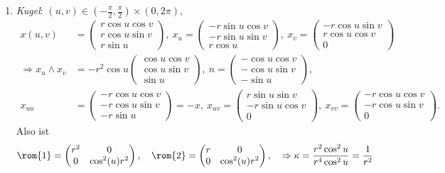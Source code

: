 \begin{example}
\begin{enumerate}
    \item \emph{Kugel}: $ (u,v) \in \left( -\tfrac{\pi}{2}, \tfrac{\pi}{2} \right) \times (0, 2\pi) $,
    \begin{align*}
      x(u,v) &= \left( \begin{smallmatrix}
      r\cos u \cos v \\ r\cos u \sin v \\ r\sin u
    \end{smallmatrix} \right), \ x_u = \left( \begin{smallmatrix}
      -r\sin u \cos v \\ -r\sin u \sin v \\ r\cos u
    \end{smallmatrix} \right), \ x_v = \left( \begin{smallmatrix}
      -r\cos u \sin v \\ r\cos u \cos v \\ 0
    \end{smallmatrix} \right) \\
    \Rightarrow x_u \wedge x_v &= -r^2\cos u \left( \begin{smallmatrix}
      \cos u \cos v \\ \cos u \sin v \\ \sin u
    \end{smallmatrix} \right), \ n = \left( \begin{smallmatrix}
      -\cos u \cos v \\ -\cos u \sin v \\ -\sin u
    \end{smallmatrix} \right), \\
    x_{uu} &= \left( \begin{smallmatrix}
      -r\cos u\cos v \\ -r\cos u \sin v \\ -r\sin u
    \end{smallmatrix} \right) = -x, \ x_{uv} = \left( \begin{smallmatrix}
      r\sin u \sin v \\ -r\sin u \cos v \\ 0
    \end{smallmatrix} \right), \ x_{vv} = \left( \begin{smallmatrix}
      -r\cos u \cos v \\ -r\cos u \sin v \\ 0
    \end{smallmatrix} \right)\text{.}
    \end{align*}
    Also ist
    \begin{equation*}
      \rom{1} = \begin{pmatrix}
        r^2 & 0 \\
        0 & \cos^2(u)r^2
      \end{pmatrix}, \quad \rom{2} = \begin{pmatrix}
        r & 0 \\
        0 & \cos^2(u)r^2
      \end{pmatrix}, \quad \Rightarrow \kappa = \frac{r^2\cos^2 u}{r^4\cos^2 u} = \frac{1}{r^2}
    \end{equation*}


\end{enumerate}
\end{example}
